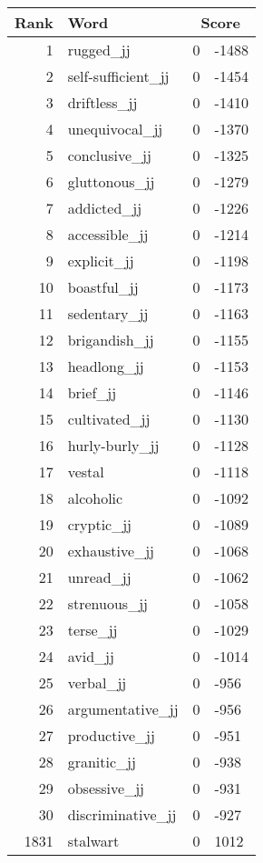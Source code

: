 \begin{longtable}[!htbp]{| rlr@{.}l |}
    \hline
    \textbf{Rank} & \textbf{Word} & \multicolumn{2}{c|}{\textbf{Score}} \\
    \hline
    \endhead
    1 & rugged\_jj & 0 & -1488 \\
    2 & self-sufficient\_jj & 0 & -1454 \\
    3 & driftless\_jj & 0 & -1410 \\
    4 & unequivocal\_jj & 0 & -1370 \\
    5 & conclusive\_jj & 0 & -1325 \\
    6 & gluttonous\_jj & 0 & -1279 \\
    7 & addicted\_jj & 0 & -1226 \\
    8 & accessible\_jj & 0 & -1214 \\
    9 & explicit\_jj & 0 & -1198 \\
    10 & boastful\_jj & 0 & -1173 \\
    11 & sedentary\_jj & 0 & -1163 \\
    12 & brigandish\_jj & 0 & -1155 \\
    13 & headlong\_jj & 0 & -1153 \\
    14 & brief\_jj & 0 & -1146 \\
    15 & cultivated\_jj & 0 & -1130 \\
    16 & hurly-burly\_jj & 0 & -1128 \\
    17 & vestal & 0 & -1118 \\
    18 & alcoholic & 0 & -1092 \\
    19 & cryptic\_jj & 0 & -1089 \\
    20 & exhaustive\_jj & 0 & -1068 \\
    21 & unread\_jj & 0 & -1062 \\
    22 & strenuous\_jj & 0 & -1058 \\
    23 & terse\_jj & 0 & -1029 \\
    24 & avid\_jj & 0 & -1014 \\
    25 & verbal\_jj & 0 & -956 \\
    26 & argumentative\_jj & 0 & -956 \\
    27 & productive\_jj & 0 & -951 \\
    28 & granitic\_jj & 0 & -938 \\
    29 & obsessive\_jj & 0 & -931 \\
    30 & discriminative\_jj & 0 & -927 \\
    1831 & stalwart & 0 & 1012 \\

\end{longtable}
